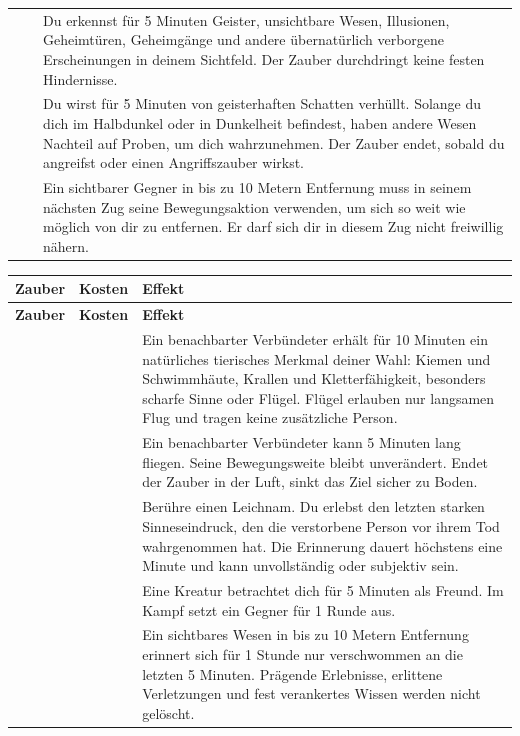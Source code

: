 \begin{xltabular}{\linewidth}{L{3.4cm} C{2.1cm} Y}
 &  & Du erkennst für 5 Minuten Geister, unsichtbare Wesen, Illusionen, Geheimtüren, Geheimgänge und andere übernatürlich verborgene Erscheinungen in deinem Sichtfeld. Der Zauber durchdringt keine festen Hindernisse. \\
 &  & Du wirst für 5 Minuten von geisterhaften Schatten verhüllt. Solange du dich im Halbdunkel oder in Dunkelheit befindest, haben andere Wesen Nachteil auf Proben, um dich wahrzunehmen. Der Zauber endet, sobald du angreifst oder einen Angriffszauber wirkst. \\
 &  & Ein sichtbarer Gegner in bis zu 10 Metern Entfernung muss in seinem nächsten Zug seine Bewegungsaktion verwenden, um sich so weit wie möglich von dir zu entfernen. Er darf sich dir in diesem Zug nicht freiwillig nähern. \\
\end{xltabular}
\endgroup


\begingroup
\hplongtablestyle
\begin{xltabular}{\linewidth}{L{3.4cm} C{2.1cm} Y}
\textbf{Zauber} & \textbf{Kosten} & \textbf{Effekt} \\
\hline
\endfirsthead
\textbf{Zauber} & \textbf{Kosten} & \textbf{Effekt} \\
\hline
\endhead
{} &  & Ein benachbarter Verbündeter erhält für 10 Minuten ein natürliches tierisches Merkmal deiner Wahl: Kiemen und Schwimmhäute, Krallen und Kletterfähigkeit, besonders scharfe Sinne oder Flügel. Flügel erlauben nur langsamen Flug und tragen keine zusätzliche Person. \\
 &  & Ein benachbarter Verbündeter kann 5 Minuten lang fliegen. Seine Bewegungsweite bleibt unverändert. Endet der Zauber in der Luft, sinkt das Ziel sicher zu Boden. \\
 &  & Berühre einen Leichnam. Du erlebst den letzten starken Sinneseindruck, den die verstorbene Person vor ihrem Tod wahrgenommen hat. Die Erinnerung dauert höchstens eine Minute und kann unvollständig oder subjektiv sein. \\
 &  & Eine Kreatur betrachtet dich für 5 Minuten als Freund. Im Kampf setzt ein Gegner für 1 Runde aus. \\
 &  & Ein sichtbares Wesen in bis zu 10 Metern Entfernung erinnert sich für 1 Stunde nur verschwommen an die letzten 5 Minuten. Prägende Erlebnisse, erlittene Verletzungen und fest verankertes Wissen werden nicht gelöscht. \\
\end{xltabular}
\endgroup


